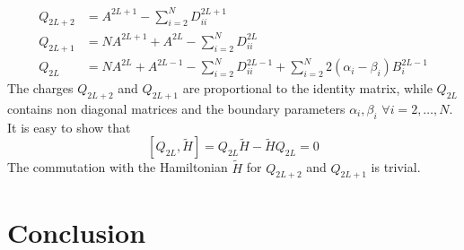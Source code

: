 \documentclass[11pt]{article}
\numberwithin{equation}{section}
\begin{document}
\begin{align}
	Q_{2L+2}&=A^{2L+1}-\sum_{i=2}^{N}D_{ii}^{2L+1}\\
	Q_{2L+1}&=NA^{2L+1}+A^{2L}-\sum_{i=2}^{N}D_{ii}^{2L}\\
	Q_{2L}&=NA^{2L}+A^{2L-1}-\sum_{i=2}^{N}D_{ii}^{2L-1}+\sum_{i=2}^{N}2(\alpha_{i}-\beta_{i})B_{i}^{2L-1}
\end{align}
The charges $Q_{2L+2}$ and $Q_{2L+1}$ are proportional to the identity matrix, while $Q_{2L}$ contains non diagonal matrices and the boundary parameters $\alpha_{i},\beta_{i}$ $\forall i=2,\ldots,N$.\\
It is easy to show that 
\begin{equation}
	\left[Q_{2L},\widetilde{H}\right]=Q_{2L}\widetilde{H}-\widetilde{H}Q_{2L}=0
\end{equation}
The commutation with the Hamiltonian $\widetilde{H}$ for $Q_{2L+2}$ and $Q_{2L+1}$ is trivial. 
\section{Conclusion}




\end{document}
